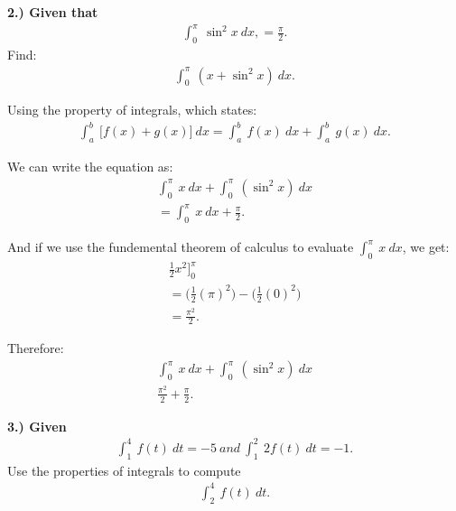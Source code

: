 \documentclass{report}
\begin{document}
    \pagebreak \bigbreak \noindent
    \begin{mdframed}
        \textbf{2.) Given that}
        \begin{align*}
            \int_{0}^{\pi}\ \sin^{2}{x}\ dx, = \frac{\pi}{2}
        .\end{align*}
        Find:
        \begin{align*}
            \int_{0}^{\pi}\ (x+\sin^{2}{x})\ dx
        .\end{align*}
    \end{mdframed}
    \bigbreak \noindent \bigbreak \noindent
    Using the property of integrals, which states:
    \begin{align*}
        \int_{a}^{b}\ \big[f(x) + g(x)\big]\ dx = \int_{a}^{b}\ f(x)\ dx + \int_{a}^{b}\ g(x)\ dx
    .\end{align*}

    \bigbreak \noindent \bigbreak \noindent
    We can write the equation as:
    \begin{align*}
        \int_{0}^{\pi}\ x\ dx + \int_{0}^{\pi}\ (\sin^{2}{x})\ dx \\
        = \int_{0}^{\pi}\ x\ dx + \frac{\pi}{2}
    .\end{align*}

    \bigbreak \noindent \bigbreak \noindent
    And if we use the fundemental theorem of calculus to evaluate $\int_{0}^{\pi}\ x\ dx $, we get:
    \begin{align*}
        \frac{1}{2}x^{2}\bigg]_{0}^{\pi} \\
        = \bigg(\frac{1}{2}(\pi )^{2}\bigg) - \bigg(\frac{1}{2}(0)^{2}\bigg) \\
        = \frac{\pi^{2}}{2}
    .\end{align*}

    \bigbreak \noindent \bigbreak \noindent
    Therefore:
    \begin{align*}
      \int_{0}^{\pi}\ x\ dx + \int_{0}^{\pi}\ (\sin^{2}{x})\ dx \\
      \boxed{\frac{\pi^{2}}{2}+\frac{\pi}{2}}
    .\end{align*}

    \pagebreak \bigbreak \noindent
    \begin{mdframed}
      \textbf{3.) Given}
      \begin{align*}
        \int_{1}^{4}\ f(t)\ dt = -5\ and\ \int_{1}^{2}\ 2f(t)\ dt = -1
      .\end{align*}
      \bigbreak \noindent 
      Use the properties of integrals to compute
      \begin{align*}
        \int_{2}^{4}\ f(t)\ dt
      .\end{align*}
    \end{mdframed}
\end{document}

